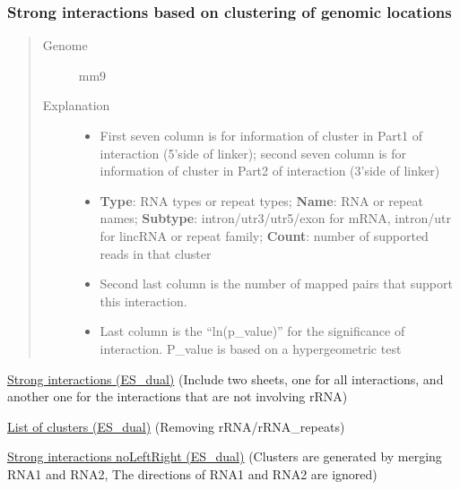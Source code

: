 \documentclass[letterpaper,10pt,english]{sphinxmanual}
\begin{document}
\subsubsection{Strong interactions based on clustering of genomic locations}
\label{Data_Resources:id1}\begin{quote}\begin{description}
\item[{Genome}] \leavevmode
mm9

\item[{Explanation}] \leavevmode\begin{itemize}
\item {} 
First seven column is for information of cluster in Part1 of interaction (5'side of linker); second seven column is for information of cluster in Part2 of interaction (3'side of linker)

\item {} 
\textbf{Type}: RNA types or repeat types; \textbf{Name}: RNA or repeat names; \textbf{Subtype}: intron/utr3/utr5/exon for mRNA, intron/utr for lincRNA or repeat family; \textbf{Count}: number of supported reads in that cluster

\item {} 
Second last column is the number of mapped pairs that support this interaction.

\item {} 
Last column is the ``ln(p\_value)'' for the significance of interaction. P\_value is based on a hypergeometric test

\end{itemize}

\end{description}\end{quote}

\href{http://systemsbio.ucsd.edu/RNA-Hi-C/Data/AATG\_interaction\_clusters.xlsx}{Strong interactions (ES\_dual)} (Include two sheets, one for all interactions, and another one for the interactions that are not involving rRNA)

\href{http://systemsbio.ucsd.edu/RNA-Hi-C/Data/AATG\_cluster\_total\_sort.xlsx}{List of clusters (ES\_dual)} (Removing rRNA/rRNA\_repeats)

\href{http://systemsbio.ucsd.edu/RNA-Hi-C/Data/AATG\_interaction\_clusters\_noLeftRight.xlsx}{Strong interactions noLeftRight (ES\_dual)} (Clusters are generated by merging RNA1 and RNA2, The directions of RNA1 and RNA2 are ignored)
\end{document}
